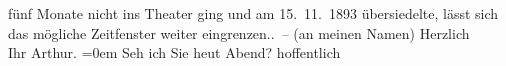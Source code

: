 \begin{ledgroupsized}[t]{13cm}
{{{{                        fünf Monate nicht ins Theater ging und am 15. 11. 1893 übersiedelte,
                        lässt sich das mögliche Zeitfenster weiter eingrenzen.}}}\label{K_L00268_2h}}. – (an meinen
               Namen)\pend
           \pstart
           Herzlich{\\[\baselineskip]}Ihr \spacefill\mbox{Arthur.}\pend
           \leftskip=0em{}\pstart
           \noindent{}Seh ich Sie heut Abend? hoffentlich\pend
                     \endnumbering{}\end{ledgroupsized}  \newcommand{\dateiname}{L00268}\newcommand{\titel}{Arthur Schnitzler an Richard Beer-Hofmann, [zwischen 5. 10. und 14. 11. 1893]}\newcommand{\editorInnen}{Martin Anton Müller und Gerd-Hermann Susen}
            \footnotesize
\begin{ledgroupsized}[t]{11.5cm}
\end{ledgroupsized}
         
      